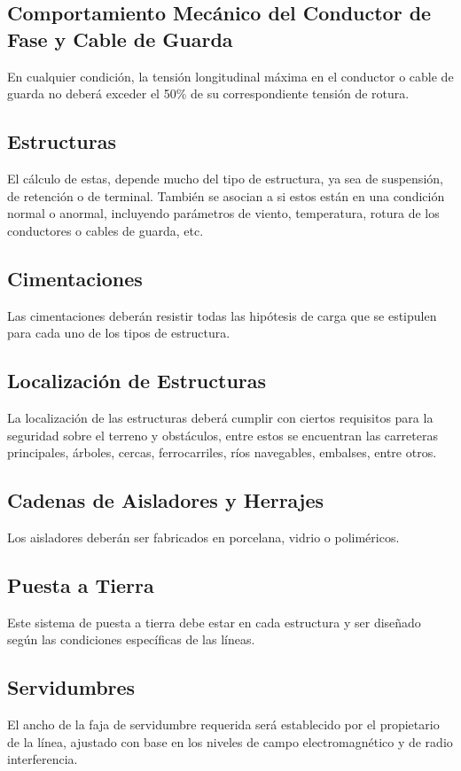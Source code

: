 \subsection{Comportamiento Mecánico del Conductor de Fase y Cable de Guarda}
En cualquier condición, la tensión longitudinal máxima en el conductor o cable de guarda no deberá exceder el 50\% de su correspondiente tensión de rotura.

\subsection{Estructuras}
El cálculo de estas, depende mucho del tipo de estructura, ya sea de suspensión, de retención o de terminal. También se asocian a si estos están en una condición normal o anormal, incluyendo parámetros de viento, temperatura, rotura de los conductores o cables de guarda, etc.

\subsection{Cimentaciones}
Las cimentaciones deberán resistir todas las hipótesis de carga que se estipulen para cada uno de los tipos de estructura.

\subsection{Localización de Estructuras}
La localización de las estructuras deberá cumplir con ciertos requisitos para la seguridad sobre el terreno y obstáculos, entre estos se encuentran las carreteras principales, árboles, cercas, ferrocarriles, ríos navegables, embalses, entre otros.

\subsection{Cadenas de Aisladores y Herrajes}
Los aisladores deberán ser fabricados en porcelana, vidrio o poliméricos.

\subsection{Puesta a Tierra}
Este sistema de puesta a tierra debe estar en cada estructura y ser diseñado según las condiciones específicas de las líneas.

\subsection{Servidumbres}
El ancho de la faja de servidumbre requerida será establecido por el propietario de la línea, ajustado con base en los niveles de campo electromagnético y de radio interferencia.
